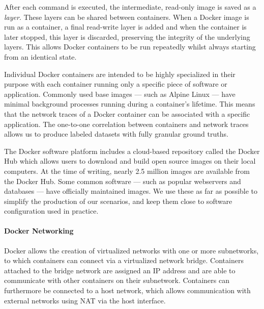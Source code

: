 After each command is executed, the intermediate, read-only image is saved as a \textit{layer}. These layers can be shared between containers. When a Docker image is run as a container, a final read-write layer is added and when the container is later stopped, this layer is discarded, preserving the integrity of the underlying layers. This allows Docker containers to be run repeatedly whilst always starting from an identical state. 


Individual Docker containers are intended to be highly specialized in their purpose with each container running only a specific piece of software or application. Commonly used base images --- such as Alpine Linux --- have minimal background processes running during a container's lifetime. This means that the network traces of a Docker container can be associated with a specific application. The one-to-one correlation between containers and network traces allows us to produce labeled datasets with fully granular ground truths.

The Docker software platform includes a cloud-based repository called the Docker Hub \cite{dockerhub} which allows users to download and build open source images on their local computers. At the time of writing, nearly 2.5 million images are available from the Docker Hub. Some common software --- such as popular webservers and databases --- have officially maintained images. We use these as far as possible to simplify the production of our scenarios, and keep them close to software configuration used in practice.


\paragraph*{Docker Networking} 
\label{SecD:network}
Docker allows the creation of virtualized networks with one or more subnetworks, to which containers can connect via a virtualized network bridge. Containers attached to the bridge network are assigned an IP address and are able to communicate with other containers on their subnetwork. Containers can furthermore be connected to a host network, which allows communication with external networks using NAT via the host interface.

